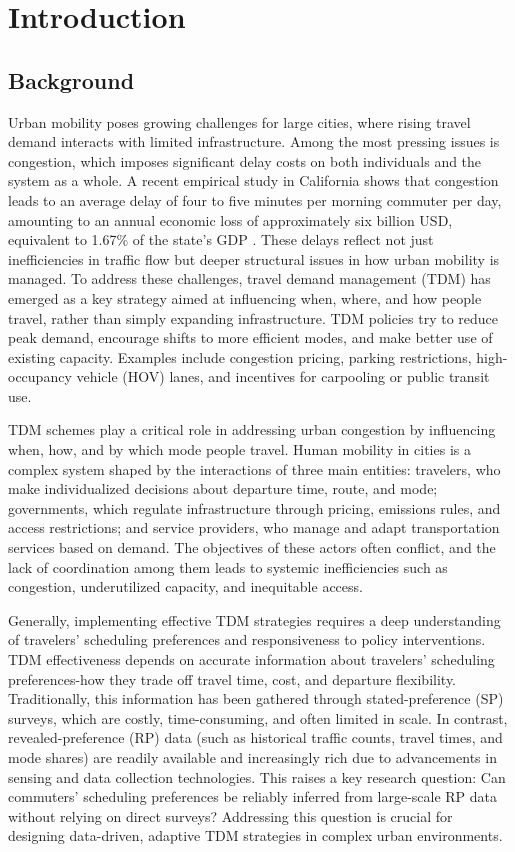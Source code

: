\chapter{Introduction}
\label{cha:introduction}

\section{Background}
Urban mobility poses growing challenges for large cities, where rising travel demand interacts with limited infrastructure. Among the most pressing issues is congestion, which imposes significant delay costs on both individuals and the system as a whole. A recent empirical study in California shows that congestion leads to an average delay of four to five minutes per morning commuter per day, amounting to an annual economic loss of approximately six billion USD, equivalent to 1.67\% of the state's GDP \parencite{kim2022congestion}. These delays reflect not just inefficiencies in traffic flow but deeper structural issues in how urban mobility is managed. To address these challenges, travel demand management (TDM) has emerged as a key strategy aimed at influencing when, where, and how people travel,
rather than simply expanding infrastructure. TDM policies try to reduce peak demand, encourage shifts to more efficient modes, and make better use of existing capacity. Examples include congestion pricing, parking restrictions, high-occupancy vehicle (HOV) lanes, and incentives for carpooling or public transit use.  

TDM schemes play a critical role in addressing urban congestion by influencing when, how, and by which mode people travel.  Human mobility in cities is a complex system shaped by the interactions of three main entities: travelers, who make individualized decisions about departure time, route, and mode; governments, which regulate infrastructure through pricing, emissions rules, and access restrictions; and service providers, who manage and adapt transportation services based on demand. The objectives of these actors often conflict, and the lack of coordination among them leads to systemic inefficiencies such as congestion, underutilized capacity, and inequitable access. 

Generally, implementing effective TDM strategies requires a deep understanding of travelers' scheduling preferences and responsiveness to policy interventions. TDM effectiveness depends on accurate information about travelers' scheduling preferences-how they trade off travel time, cost, and departure flexibility. Traditionally, this information has been gathered through stated-preference (SP) surveys, which are costly, time-consuming, and often limited in scale. In contrast, revealed-preference (RP) data (such as historical traffic counts, travel times, and mode shares) are readily available and increasingly rich due to advancements in sensing and data collection technologies. This raises a key research question: Can commuters' scheduling preferences be reliably inferred from large-scale RP data without relying on direct surveys? Addressing this question is crucial for designing data-driven, adaptive TDM strategies in complex urban environments.

